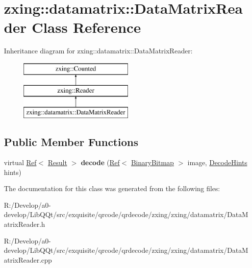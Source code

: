 \hypertarget{classzxing_1_1datamatrix_1_1_data_matrix_reader}{}\section{zxing\+:\+:datamatrix\+:\+:Data\+Matrix\+Reader Class Reference}
\label{classzxing_1_1datamatrix_1_1_data_matrix_reader}
Inheritance diagram for zxing\+:\+:datamatrix\+:\+:Data\+Matrix\+Reader\+:\begin{figure}[H]
\begin{center}
\leavevmode
\includegraphics[height=3.000000cm]{classzxing_1_1datamatrix_1_1_data_matrix_reader}
\end{center}
\end{figure}
\subsection*{Public Member Functions}
\begin{DoxyCompactItemize}
\item 
\mbox{\label{classzxing_1_1datamatrix_1_1_data_matrix_reader_a833c31faa9315cccc483f88a63793a68}} 
virtual \mbox{\hyperlink{classzxing_1_1_ref}{Ref}}$<$ \mbox{\hyperlink{classzxing_1_1_result}{Result}} $>$ {\bfseries decode} (\mbox{\hyperlink{classzxing_1_1_ref}{Ref}}$<$ \mbox{\hyperlink{classzxing_1_1_binary_bitmap}{Binary\+Bitmap}} $>$ image, \mbox{\hyperlink{classzxing_1_1_decode_hints}{Decode\+Hints}} hints)
\end{DoxyCompactItemize}


The documentation for this class was generated from the following files\+:\begin{DoxyCompactItemize}
\item 
R\+:/\+Develop/a0-\/develop/\+Lib\+Q\+Qt/src/exquisite/qrcode/qrdecode/zxing/zxing/datamatrix/Data\+Matrix\+Reader.\+h\item 
R\+:/\+Develop/a0-\/develop/\+Lib\+Q\+Qt/src/exquisite/qrcode/qrdecode/zxing/zxing/datamatrix/Data\+Matrix\+Reader.\+cpp\end{DoxyCompactItemize}
